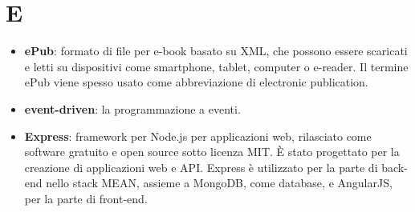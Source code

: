 \section{E}
\begin{itemize} 
	\item \textbf{ePub}: formato di file per e-book basato su XML, che possono essere scaricati e letti su dispositivi come smartphone, tablet, computer o e-reader. Il termine ePub viene spesso usato come abbreviazione di electronic publication.
	\item \textbf{event-driven}: la programmazione a eventi.
	\item \textbf{Express}: framework per Node.js per applicazioni web, rilasciato come software gratuito e open source sotto licenza MIT. È stato progettato per la creazione di applicazioni web e API. Express è utilizzato per la parte di back-end nello stack MEAN, assieme a MongoDB, come database, e AngularJS, per la parte di front-end.
\end{itemize}
